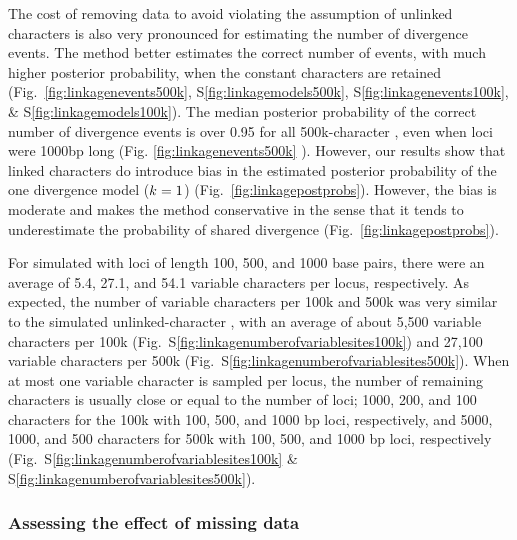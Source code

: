 \ifembed{

}{}

The cost of removing data to avoid violating the assumption of unlinked
characters is also very pronounced for estimating the  number of divergence events.
The method better estimates the correct  number of events,
 with much higher posterior probability, when the constant
characters are retained 
(Fig.\ 
\ref{fig:linkagenevents500k},
S\ref{fig:linkagemodels500k},
S\ref{fig:linkagenevents100k},
\&
S\ref{fig:linkagemodels100k}).
The median posterior probability of  the correct number of
divergence events \jroedit{}{and the correct model} is over 0.95 for all
500k-character \datasets, even when loci were 1000bp long
(Fig. \ref{fig:linkagenevents500k}
).
However, our results show that linked characters do introduce bias in the
estimated posterior probability of the one divergence model ($k_{}{} = 1$)
(Fig.~\ref{fig:linkagepostprobs}).
However, the bias is moderate and makes the method conservative in the
sense that it tends to underestimate the probability of shared
divergence (Fig.~\ref{fig:linkagepostprobs}).

\ifembed{



}{}

For simulated \datasets with loci of length 100, 500, and 1000 base pairs, there
were an average of 5.4, 27.1, and 54.1 variable characters per locus,
respectively.
As expected, the number of variable characters per 100k and 500k \dataset was
very similar to the simulated unlinked-character \datasets, with an average of
about
5,500 variable characters per 100k \dataset
(Fig.~S\ref{fig:linkagenumberofvariablesites100k})
and
27,100 variable characters per 500k \dataset
(Fig.~S\ref{fig:linkagenumberofvariablesites500k}).
When at most one variable character is sampled per locus, the
number of remaining characters is usually close or equal to the
number of loci;
1000, 200, and 100 characters for the 100k \datasets
with 100, 500, and 1000 bp loci, respectively, and
5000, 1000, and 500 characters for 500k \datasets
with 100, 500, and 1000 bp loci, respectively
(Fig.\ 
S\ref{fig:linkagenumberofvariablesites100k}
\&
S\ref{fig:linkagenumberofvariablesites500k}).


\subsubsection{Assessing the effect of missing data}

